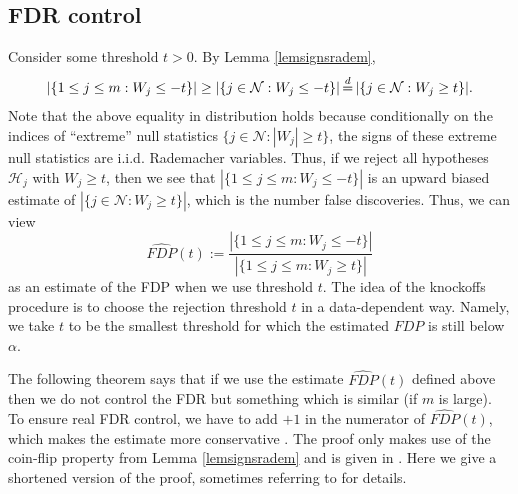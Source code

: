\documentclass[11pt]{article}
\theoremstyle{plain}
\theoremstyle{definition}
\newcommand{\N}{\mathcal{N}}
\newcommand{\Hy}{\mathcal{H}}
\newcommand{\citt}{\citet}
\newcommand{\citp}{\citep}
\begin{document}
 \subsection{FDR control}
 Consider some threshold $t>0$. By Lemma \ref{lemsignsradem},
 $$|\{1\leq j \leq m: W_j\leq -t\}|\geq |\{j\in \N: W_j\leq-t\}| \,{\buildrel d \over =}\,  |\{j\in \N: W_j\geq t\}|.$$
 Note that the above equality in distribution holds because conditionally on the indices of ``extreme'' null statistics $\{j\in \N: |W_j|\geq t\}$, the signs of these extreme null statistics are i.i.d. Rademacher variables.
 Thus, if we reject all hypotheses $\Hy_j$ with $W_j\geq t$, then we see that $|\{1\leq j \leq m: W_j\leq -t\}|$ is an upward biased estimate of $|\{j\in \N: W_j\geq t\}|$, which is the number false discoveries.
 Thus, we can view
 $$\widehat{FDP}(t):= \frac{|\{1\leq j \leq m: W_j\leq-t\}|}{|\{1\leq j \leq m: W_j\geq t\}|}$$ as an estimate of  the FDP when we use threshold $t$.
 The idea of the knockoffs procedure is to choose the rejection threshold $t$ in a data-dependent way. Namely, we take $t$ to be the smallest threshold for which the estimated $FDP$ is still below $\alpha$.
 
 The following theorem says that if we use the estimate $\widehat{FDP}(t)$ defined above then we do not control the FDR but something which is similar (if $m$ is large). To ensure real FDR control, we have to  add $+1$ in the numerator of $\widehat{FDP}(t)$, which makes the estimate more conservative \citp[][p.562]{candes2018panning}. The proof only makes use of the coin-flip property from  Lemma \ref{lemsignsradem}  and is given in \citt{barber2015controlling}. Here we give a shortened version of the proof, sometimes referring to \citt{barber2015controlling} for details.
 
\end{document}
